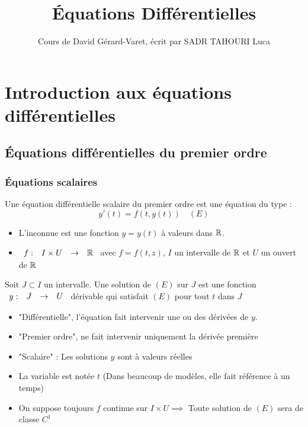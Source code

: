 \documentclass[]{report}
\title{Équations Différentielles}
\author{Cours de David Gérard-Varet, écrit par SADR TAHOURI Luca}
\date{}
\begin{document}
    \maketitle
    \tableofcontents

\chapter{Introduction aux équations différentielles}

\section{Équations différentielles du premier ordre}

\subsection{Équations scalaires}

\begin{df}
    Une équation différentielle scalaire du premier ordre est une équation du type :$$y'(t)=f(t,y(t)) \quad (E)$$
    \begin{itemize}
        \item L'inconnue est une fonction $y=y(t)$ à valeurs dans $\mathbb{R}$.
        \item $\begin{array}{ccccc} f : & I\times U & \to & \mathbb{R} \end{array}$ avec $f=f(t,z)$, $I$ un intervalle de $\mathbb{R}$ et $U$ un ouvert de $\mathbb{R}$
    \end{itemize}
\end{df}

\begin{df}
    Soit $J\subset I$ un intervalle. Une solution de $(E)$ sur $J$ est une fonction $\begin{array}{ccccc} y : & J & \to & U \end{array}$ dérivable qui satisfait $(E)$ pour tout $t$ dans $J$
\end{df}

\begin{re}
    \begin{itemize}
        \item "Différentielle", l'équation fait intervenir une ou des dérivées de $y$.
        \item "Premier ordre", ne fait intervenir uniquement la dérivée première
        \item "Scalaire" : Les solutions $y$ sont à valeurs réelles
        \item La variable est notée $t$ (Dans beaucoup de modèles, elle fait référence à un temps)
        \item On suppose toujours $f$ continue sur $I\times U\implies$ Toute solution de $(E)$ sera de classe $C^1$
    \end{itemize}
\end{re}
\end{document}
